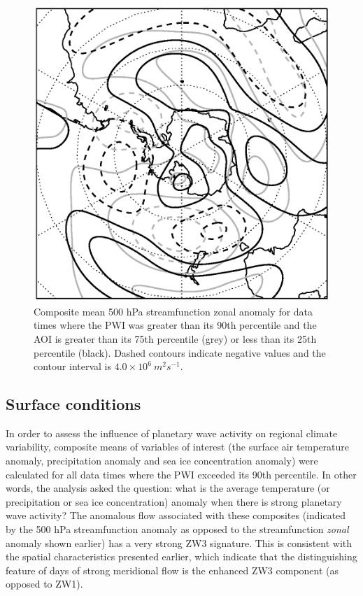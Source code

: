 \begin{figure}
\begin{center}
\includegraphics[width=0.56\columnwidth]{figures/zonalwaves/sf-composite_samgt75pct-samlt25pct-pwigt90pct_ERAInterim_500hPa_030day-runmean_native-zonal-anom-shextropics15.eps}
\caption[Comparison of the composite mean 500 hPa streamfunction zonal anomaly for data times where the PWI was greater than its 90th percentile and the SAM was (a) positive and (b) negative]{\label{fig:sam_composite}
Composite mean 500 hPa streamfunction zonal anomaly for data times where the PWI was greater than its 90th percentile and the AOI is greater than its 75th percentile (grey) or less than its 25th percentile (black). Dashed contours indicate negative values and the contour interval is $4.0 \times 10^6 \: m^2 s^{-1}$.}
\end{center}
\end{figure}


\subsection{Surface conditions}\label{s:surface_conditions}

In order to assess the influence of planetary wave activity on regional climate variability, composite means of variables of interest (the surface air temperature anomaly, precipitation anomaly and sea ice concentration anomaly) were calculated for all data times where the PWI exceeded its 90th percentile. In other words, the analysis asked the question: what is the average temperature (or precipitation or sea ice concentration) anomaly when there is strong planetary wave activity? The anomalous flow associated with these composites (indicated by the 500 hPa streamfunction anomaly as opposed to the streamfunction \textit{zonal} anomaly shown earlier) has a very strong ZW3 signature. This is consistent with the spatial characteristics presented earlier, which indicate that the distinguishing feature of days of strong meridional flow is the enhanced ZW3 component (as opposed to ZW1).  


